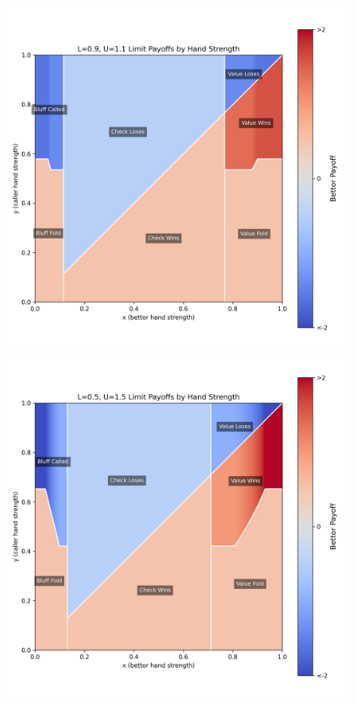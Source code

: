 \documentclass[a4paper,12pt]{article}
\theoremstyle{plain}
\theoremstyle{definition}
\begin{document}
\begin{figure}[h!]
\begin{adjustwidth}{-1in}{-1in}
        \begin{minipage}{0.4\textwidth}
            \centering
            \includegraphics[width=\textwidth]{LU_payoffs_0.9_1.1.png}
        \end{minipage}
        \hspace{0.02\textwidth}
        \begin{minipage}{0.4\textwidth}
            \centering
            \includegraphics[width=\textwidth]{LU_payoffs_0.5_1.5.png}

\end{minipage}
\end{adjustwidth}
\end{figure}
\end{document}
